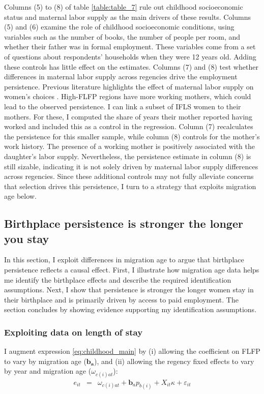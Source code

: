 \tftext{}

Columns (5) to (8) of table  \ref{table:table_7} rule out childhood socioeconomic status and maternal labor supply as the main drivers of these results. Columns (5) and (6) examine the role of childhood socioeconomic conditions, using variables such as the number of books, the number of people per room, and whether their father was in formal employment. These variables come from a set of questions about respondents' households when they were 12 years old. Adding these controls has little effect on the estimates. Columns (7) and (8) test whether differences in maternal labor supply across regencies drive the employment persistence. Previous literature highlights the effect of maternal labor supply on women's choices \citep{Fernandez2004,Morrill2013,Olivettib}. High-FLFP regions have more working mothers, which could lead to the observed persistence. I can link a subset of IFLS women to their mothers. For these, I computed the share of years their mother reported having worked and included this as a control in the regression. Column (7) recalculates the persistence for this smaller sample, while column (8) controls for the mother's work history. The presence of a working mother is positively associated with the daughter's labor supply. Nevertheless, the persistence estimate in column (8) is still sizable, indicating it is not solely driven by maternal labor supply differences across regencies. Since these additional controls may not fully alleviate concerns that selection drives this persistence, I turn to a strategy that exploits migration age below.




\subsection{Birthplace persistence is stronger the longer you stay}	
\label{sec:age}

In this section, I exploit differences in migration age to argue that birthplace persistence reflects a causal effect. First, I illustrate how migration age data helps me identify the birthplace effects and describe the required identification assumptions. Next, I show that persistence is stronger the longer women stay in their birthplace and is primarily driven by access to paid employment. The section concludes by showing evidence supporting my identification assumptions.

\subsubsection{Exploiting data on length of stay}
I augment expression \eqref{eq:childhood_main} by (i) allowing the coefficient on FLFP to vary by migration age ($\boldsymbol{b_a}$), and (ii) allowing the regency fixed effects to vary by year and migration age ($\omega_{c(i)at}$):
\begin{eqnarray}
	\label{eq:childhood_length}
	e_{it}&=&\omega_{c(i)at}+\boldsymbol b_a p_{b(i)}+X_{it}\kappa+\varepsilon_{it}
\end{eqnarray}

